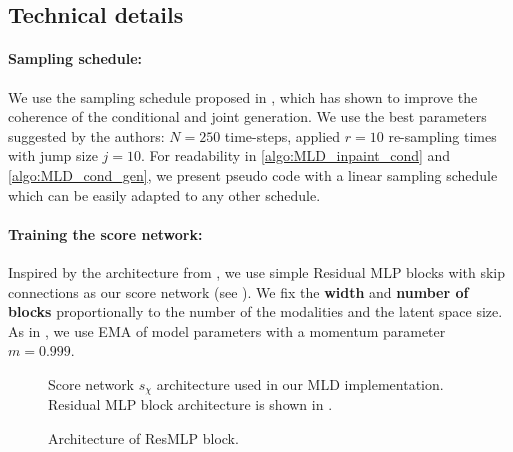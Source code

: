 \subsection{Technical details}

\paragraph{Sampling schedule:}
\label{sec:repaint_sche}
We use the sampling schedule proposed in \cite{lugmayr2022repaint}, which has shown to improve the coherence of the conditional and joint generation. We use the best parameters suggested by the authors: $N = 250$ time-steps, applied $r = 10$ re-sampling times with jump size $j = 10$. For readability in \cref{algo:MLD_inpaint_cond} and \cref{algo:MLD_cond_gen},  we present pseudo code  with a linear sampling schedule which can be easily adapted to any other schedule.

\paragraph{Training the score network: }
Inspired by the architecture from \citep{dupont22_fucnta}, we use simple Residual \gls{MLP} blocks with skip connections as our score network (see ). We fix the \textbf{width} and \textbf{number of blocks} proportionally to the number of the modalities and the latent space size. As in \cite{song2020improved}, we use \gls{EMA} of model parameters with a momentum parameter $m = 0.999$.



\begin{figure}[h]
\centering

\caption{Score network $s_\chi$ architecture used in our \gls{MLD} implementation. Residual \gls{MLP} block architecture is shown in .}
\label{fig:score_net}
\end{figure}

\begin{figure}[h]
    \centering
    
    \caption{Architecture of ResMLP block.}
    \label{fig:resmlp}
\end{figure}


























    

